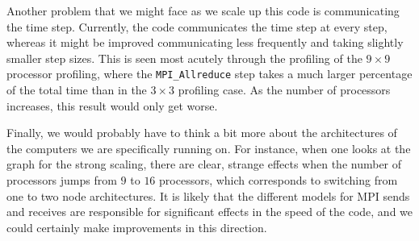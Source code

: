 \documentclass{article}
\begin{document}
Another problem that we might face as we scale up this code is communicating the time step. Currently, the code communicates the time step at every step, whereas it might be improved communicating less frequently and taking slightly smaller step sizes. This is seen most acutely through the profiling of the $9\times 9$ processor profiling, where the \texttt{MPI\_Allreduce} step takes a much larger percentage of the total time than in the $3\times3$ profiling case. As the number of processors increases, this result would only get worse. 

Finally, we would probably have to think a bit more about the architectures of the computers we are specifically running on. For instance, when one looks at the graph for the strong scaling, there are clear, strange effects when the number of processors jumps from $9$ to $16$ processors, which corresponds to switching from one to two node architectures. It is likely that the different models for MPI sends and receives are responsible for significant effects in the speed of the code, and we could certainly make improvements in this direction.

\appendix
\end{document}
